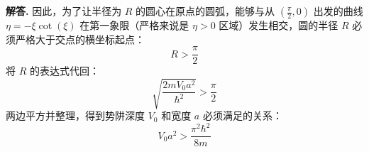\documentclass[12pt, a4paper, oneside]{ctexart}
\newenvironment{solution}{\par\noindent\textbf{解答. }}{\par}
\begin{document}
\begin{solution}
因此，为了让半径为 $R$ 的圆心在原点的圆弧，能够与从 $\left(\frac{\pi}{2}, 0\right)$ 出发的曲线 $\eta = -\xi \cot(\xi)$ 在第一象限（严格来说是 $\eta > 0$ 区域）发生相交，圆的半径 $R$ 必须严格大于交点的横坐标起点：
\[
    R > \frac{\pi}{2}
\]
将 $R$ 的表达式代回：
\[
    \sqrt{\frac{2mV_0a^2}{\hbar^2}} > \frac{\pi}{2}
\]
两边平方并整理，得到势阱深度 $V_0$ 和宽度 $a$ 必须满足的关系：
\[
    V_0 a^2 > \frac{\pi^2 \hbar^2}{8m}
\]

\end{solution}
\end{document}
